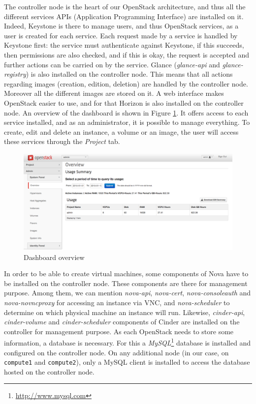 The controller node is the heart of our OpenStack architecture, and thus all the different services APIs (Application Programming Interface) are installed on it. 
Indeed, Keystone is there to manage users, and thus OpenStack services, as a user is created for each service. 
Each request made by a service is handled by Keystone first: the service must authenticate against Keystone, if this succeeds, then permissions are also checked, and if this is okay, the request is accepted and further actions can be carried on by the service. 
Glance (\textit{glance-api} and \textit{glance-registry}) is also installed on the controller node. 
This means that all actions regarding images (creation, edition, deletion) are handled by the controller node. 
Moreover all the different images are stored on it.
A web interface makes OpenStack easier to use, and for that Horizon is also installed on the controller node.
An overview of the dashboard is shown in Figure \ref{fig:dashboard}. 
It offers access to each service installed, and as an administrator, it is possible to manage everything. 
To create, edit and delete an instance, a volume or an image, the user will access these services through the \textit{Project} tab.
%
\begin{figure}[h]
	\centering
	\includegraphics[scale=0.36]{figures/dashboard.png}
	\caption{Dashboard overview}
	\label{fig:dashboard}
\end{figure}
%
In order to be able to create virtual machines, some components of Nova have to be installed on the controller node. These components are there for management purpose. 
Among them, we can mention \textit{nova-api}, \textit{nova-cert}, \textit{nova-consoleauth} and \textit{nova-novncproxy} for accessing an instance via VNC, and \textit{nova-scheduler} to determine on which physical machine an instance will run.
Likewise, \textit{cinder-api}, \textit{cinder-volume} and \textit{cinder-scheduler} components of Cinder are installed on the controller for management purpose.
As each OpenStack needs to store some information, a database is necessary. 
For this a \textit{MySQL}\footnote{\url{http://www.mysql.com}} database is installed and configured on the controller node. 
On any additional node (in our case, on \texttt{compute1} and \texttt{compute2}), only a MySQL client is installed to access the database hosted on the controller node.


